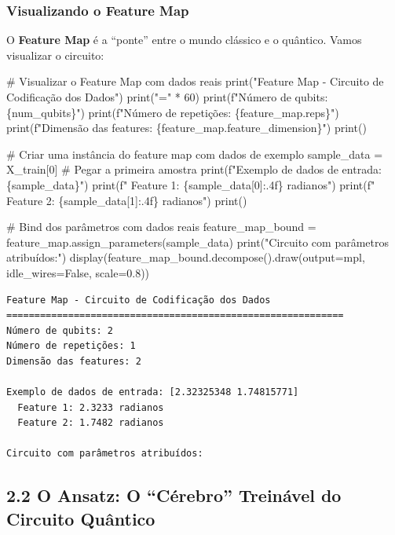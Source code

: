 \documentclass[
  brazilian,
]{report}
\newenvironment{Shaded}{\begin{snugshade}}{\end{snugshade}}
\newcommand{\NormalTok}[1]{\textcolor[rgb]{0.00,0.23,0.31}{#1}}
\begin{document}
\subsubsection{Visualizando o Feature
Map}\label{visualizando-o-feature-map}

O \textbf{Feature Map} é a ``ponte'' entre o mundo clássico e o
quântico. Vamos visualizar o circuito:

\begin{Shaded}
\begin{Highlighting}[]

\NormalTok{\# Visualizar o Feature Map com dados reais}
\NormalTok{print("Feature Map {-} Circuito de Codificação dos Dados")}
\NormalTok{print("=" * 60)}
\NormalTok{print(f"Número de qubits: \{num\_qubits\}")}
\NormalTok{print(f"Número de repetições: \{feature\_map.reps\}")}
\NormalTok{print(f"Dimensão das features: \{feature\_map.feature\_dimension\}")}
\NormalTok{print()}

\NormalTok{\# Criar uma instância do feature map com dados de exemplo}
\NormalTok{sample\_data = X\_train[0]  \# Pegar a primeira amostra}
\NormalTok{print(f"Exemplo de dados de entrada: \{sample\_data\}")}
\NormalTok{print(f"  Feature 1: \{sample\_data[0]:.4f\} radianos")}
\NormalTok{print(f"  Feature 2: \{sample\_data[1]:.4f\} radianos")}
\NormalTok{print()}

\NormalTok{\# Bind dos parâmetros com dados reais}
\NormalTok{feature\_map\_bound = feature\_map.assign\_parameters(sample\_data)}
\NormalTok{print("Circuito com parâmetros atribuídos:")}
\NormalTok{display(feature\_map\_bound.decompose().draw(output=\textquotesingle{}mpl\textquotesingle{}, idle\_wires=False, scale=0.8))}
\end{Highlighting}
\end{Shaded}

\begin{verbatim}
Feature Map - Circuito de Codificação dos Dados
============================================================
Número de qubits: 2
Número de repetições: 1
Dimensão das features: 2

Exemplo de dados de entrada: [2.32325348 1.74815771]
  Feature 1: 2.3233 radianos
  Feature 2: 1.7482 radianos

Circuito com parâmetros atribuídos:
\end{verbatim}

\subsection{2.2 O Ansatz: O ``Cérebro'' Treinável do Circuito
Quântico}\label{o-ansatz-o-cuxe9rebro-treinuxe1vel-do-circuito-quuxe2ntico}
\end{document}
